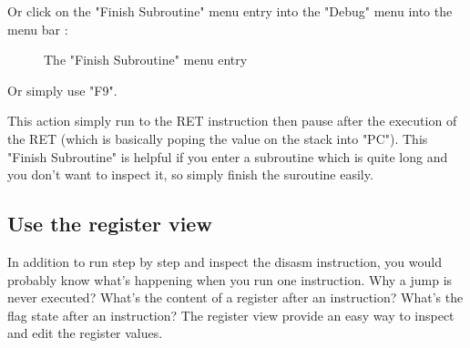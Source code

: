 \documentclass[10pt]{report}
\begin{document}
Or click on the "Finish Subroutine" menu entry into the "Debug" menu into the menu bar :\newline
\begin{figure}[H]
\centering
{}
\caption{The "Finish Subroutine" menu entry} 
\end{figure}

Or simply use "F9".\newline

This action simply run to the RET instruction then pause after the execution of the RET (which is basically poping the value on the stack into "PC").\newline
This "Finish Subroutine" is helpful if you enter a subroutine which is quite long and you don't want to inspect it, so simply finish the suroutine easily.\newline

\subsection{Use the register view}
In addition to run step by step and inspect the disasm instruction, you would probably know what's happening when you run one instruction.\newline
Why a jump is never executed? What's the content of a register after an instruction?
What's the flag state after an instruction?\newline\newline
The register view provide an easy way to inspect and edit the register values.\newline\newline
\end{document}
